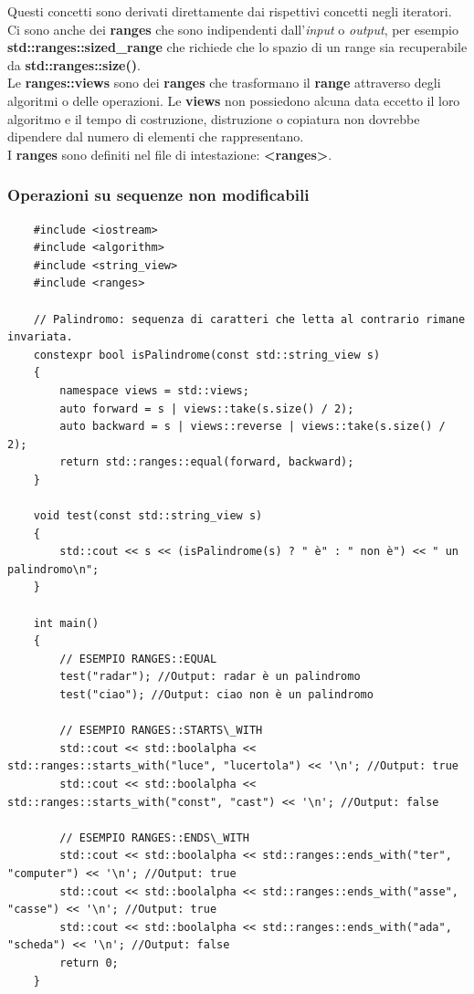 \textsf{\small Questi concetti sono derivati direttamente dai rispettivi concetti negli iteratori.} \\

\textsf{\small Ci sono anche dei \textbf{ranges} che sono indipendenti dall'\emph{input} o \emph{output}, per esempio \textbf{std::ranges::sized\_range} che richiede che lo spazio di un range sia recuperabile da \textbf{std::ranges::size()}.} \\

\textsf{\small Le \textbf{ranges::views} sono dei \textbf{ranges} che trasformano il \textbf{range} attraverso degli algoritmi o delle operazioni. Le \textbf{views} non possiedono alcuna data eccetto il loro algoritmo e il tempo di costruzione, distruzione o copiatura non dovrebbe dipendere dal numero di elementi che rappresentano.} \\

\textsf{\small I \textbf{ranges} sono definiti nel file di intestazione: \textbf{<ranges>}.} \\

\subsubsection{Operazioni su sequenze non modificabili}

\label{ranges_seq_non_modificabili}

\begin{lstlisting}
	#include <iostream>
	#include <algorithm>
	#include <string_view>
	#include <ranges>
	
	// Palindromo: sequenza di caratteri che letta al contrario rimane invariata.
	constexpr bool isPalindrome(const std::string_view s)
	{
		namespace views = std::views;
		auto forward = s | views::take(s.size() / 2);
		auto backward = s | views::reverse | views::take(s.size() / 2);
		return std::ranges::equal(forward, backward);
	}
	
	void test(const std::string_view s)
	{
		std::cout << s << (isPalindrome(s) ? " è" : " non è") << " un palindromo\n";
	}
	
	int main()
	{
		// ESEMPIO RANGES::EQUAL
		test("radar"); //Output: radar è un palindromo
		test("ciao"); //Output: ciao non è un palindromo
		
		// ESEMPIO RANGES::STARTS\_WITH
		std::cout << std::boolalpha << std::ranges::starts_with("luce", "lucertola") << '\n'; //Output: true
		std::cout << std::boolalpha << std::ranges::starts_with("const", "cast") << '\n'; //Output: false
		
		// ESEMPIO RANGES::ENDS\_WITH
		std::cout << std::boolalpha << std::ranges::ends_with("ter", "computer") << '\n'; //Output: true
		std::cout << std::boolalpha << std::ranges::ends_with("asse", "casse") << '\n'; //Output: true
		std::cout << std::boolalpha << std::ranges::ends_with("ada", "scheda") << '\n'; //Output: false
		return 0;
	}
\end{lstlisting}

